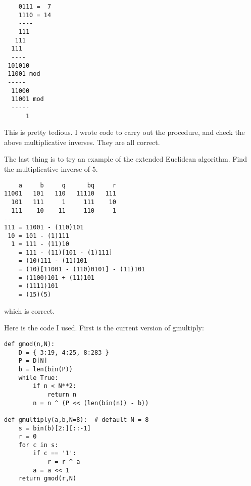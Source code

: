 \documentclass[11pt, oneside]{article}
\begin{document}
\begin{verbatim}
    0111 =  7
    1110 = 14
    ----
    111
   111
  111
  ----
 101010
 11001 mod
 -----
  11000
  11001 mod
  -----
      1
\end{verbatim}

This is pretty tedious.  I wrote code to carry out the procedure, and check the above multiplicative inverses.  They are all correct.

The last thing is to try an example of the extended Euclidean algorithm.  Find the multiplicative inverse of 5.
 
\begin{verbatim}
    a     b     q      bq     r
11001   101   110   11110   111
  101   111     1     111    10
  111    10    11     110     1
-----
111 = 11001 - (110)101
 10 = 101 - (1)111
  1 = 111 - (11)10
    = 111 - (11)[101 - (1)111]
    = (10)111 - (11)101
    = (10)[11001 - (110)0101] - (11)101
    = (1100)101 + (11)101
    = (1111)101
    = (15)(5)
\end{verbatim}
which is correct.

Here is the code I used.  First is the current version of gmultiply:

\begin{verbatim}
def gmod(n,N):
    D = { 3:19, 4:25, 8:283 }
    P = D[N]
    b = len(bin(P))
    while True:
        if n < N**2:
            return n
        n = n ^ (P << (len(bin(n)) - b))

def gmultiply(a,b,N=8):  # default N = 8
    s = bin(b)[2:][::-1]   
    r = 0
    for c in s:
        if c == '1':
            r = r ^ a
        a = a << 1
    return gmod(r,N)
\end{verbatim}
\end{document}
